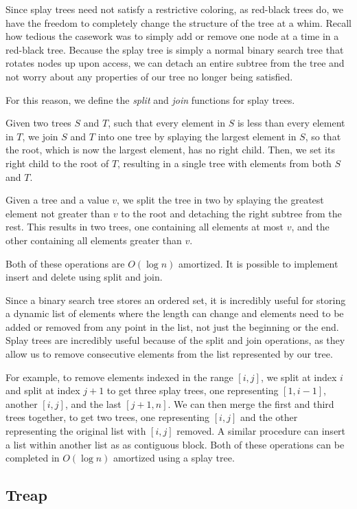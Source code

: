 Since splay trees need not satisfy a restrictive coloring, as red-black trees do, we have the freedom to completely change the structure of the tree at a whim. Recall how tedious the casework was to simply add or remove one node at a time in a red-black tree. Because the splay tree is simply a normal binary search tree that rotates nodes up upon access, we can detach an entire subtree from the tree and not worry about any properties of our tree no longer being satisfied.

For this reason, we define the \textit{split} and \textit{join} functions for splay trees.

Given two trees $S$ and $T$, such that every element in $S$ is less than every element in $T$, we join $S$ and $T$ into one tree by splaying the largest element in $S$, so that the root, which is now the largest element, has no right child. Then, we set its right child to the root of $T$, resulting in a single tree with elements from both $S$ and $T$.

Given a tree and a value $v$, we split the tree in two by splaying the greatest element not greater than $v$ to the root and detaching the right subtree from the rest. This results in two trees, one containing all elements at most $v$, and the other containing all elements greater than $v$.

Both of these operations are $O(\log{n})$ amortized. It is possible to implement insert and delete using split and join.

Since a binary search tree stores an ordered set, it is incredibly useful for storing a dynamic list of elements where the length can change and elements need to be added or removed from any point in the list, not just the beginning or the end. Splay trees are incredibly useful because of the split and join operations, as they allow us to remove consecutive elements from the list represented by our tree.

For example, to remove elements indexed in the range $[i, j]$, we split at index $i$ and split at index $j+1$ to get three splay trees, one representing $[1, i-1]$, another $[i,j]$, and the last $[j+1,n]$. We can then merge the first and third trees together, to get two trees, one representing $[i,j]$ and the other representing the original list with $[i,j]$ removed. A similar procedure can insert a list within another list as as contiguous block. Both of these operations can be completed in $O(\log{n})$ amortized using a splay tree.

\subsection{Treap}

